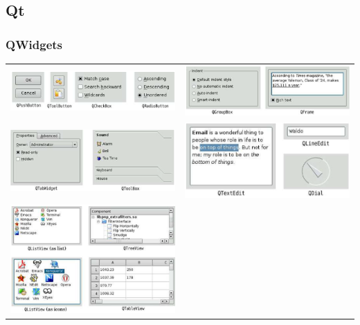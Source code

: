 \subsection{Qt}
\subsubsection{QWidgets}
\begin{tabular}{c c}
	\includegraphics[width=9cm]{images/button_1.png}&
    \includegraphics[width=9cm]{images/button_2.png}\\
	\includegraphics[width=9cm]{images/button_3.png}&
    \includegraphics[width=9cm]{images/button_7.png}\\
	\includegraphics[width=9cm]{images/button_4.png}&

\end{tabular}
